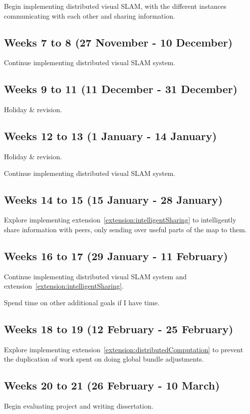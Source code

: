 \documentclass[12pt,a4paper,twoside]{article}
\begin{document}
Begin implementing distributed visual SLAM, with the different instances communicating with each other and sharing information.

\subsection*{Weeks 7 to 8 (27 November - 10 December)}
Continue implementing distributed visual SLAM system.

\subsection*{Weeks 9 to 11 (11 December - 31 December)}
Holiday \& revision.

\subsection*{Weeks 12 to 13 (1 January - 14 January)}
Holiday \& revision.

Continue implementing distributed visual SLAM system.

\subsection*{Weeks 14 to 15 (15 January - 28 January)}
Explore implementing extension~\ref{extension:intelligentSharing} to intelligently share information with peers, only sending over useful parts of the map to them.

\subsection*{Weeks 16 to 17 (29 January - 11 February)}
Continue implementing distributed visual SLAM system and extension~\ref{extension:intelligentSharing}.

Spend time on other additional goals if I have time.

\subsection*{Weeks 18 to 19 (12 February - 25 February)}
Explore implementing extension~\ref{extension:distributedComputation} to prevent the duplication of work spent on doing global bundle adjustments.

\subsection*{Weeks 20 to 21 (26 February - 10 March)}
Begin evaluating project and writing dissertation.
\end{document}
